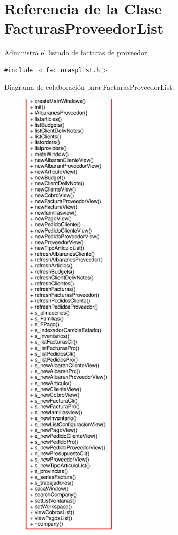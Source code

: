 \section{Referencia de la Clase Facturas\-Proveedor\-List}
\label{classFacturasProveedorList}
Administra el listado de facturas de proveedor.  


{\tt \#include $<$facturasplist.h$>$}

Diagrama de colaboraci\'{o}n para Facturas\-Proveedor\-List:\begin{figure}[H]
\begin{center}
\leavevmode
\includegraphics[width=133pt]{classFacturasProveedorList__coll__graph}
\end{center}
\end{figure}

